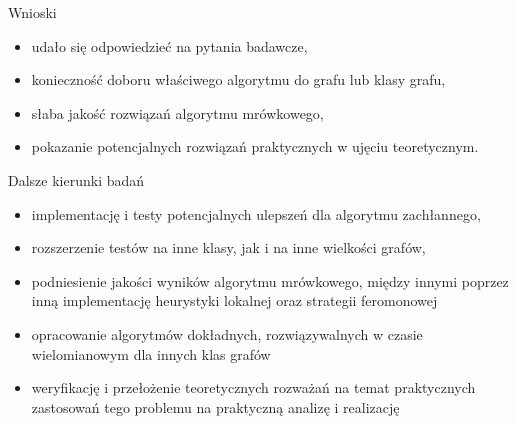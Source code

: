 \documentclass[polish,aspectratio=169]{beamer}
\begin{document}
\begin{frame}{Wnioski}
    \begin{itemize}
        \item udało się odpowiedzieć na pytania badawcze,
        \item konieczność  doboru właściwego algorytmu do grafu lub klasy grafu,
        \item słaba jakość rozwiązań algorytmu mrówkowego,
        \item pokazanie potencjalnych rozwiązań praktycznych w ujęciu teoretycznym.
    \end{itemize}
\end{frame}

\begin{frame}{Dalsze kierunki badań}
    \begin{itemize}
        \item implementację i testy potencjalnych ulepszeń dla algorytmu zachłannego,
        \item rozszerzenie testów na inne klasy, jak i na inne wielkości grafów,
        \item podniesienie jakości wyników algorytmu mrówkowego, między innymi poprzez inną implementację heurystyki lokalnej oraz strategii feromonowej
        \item opracowanie algorytmów dokładnych, rozwiązywalnych w czasie wielomianowym dla innych klas grafów
        \item weryfikację i przełożenie teoretycznych rozważań na temat praktycznych zastosowań tego problemu na praktyczną analizę i realizację

    \end{itemize}
\end{frame}


\pglastframe
\end{document}
